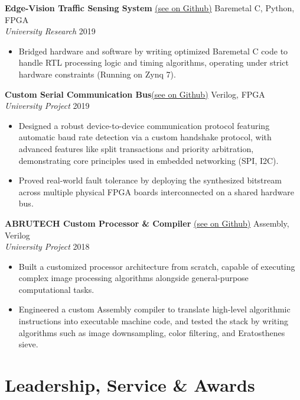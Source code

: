 \documentclass[letterpaper,10pt]{article}
\begin{document}
\vspace{6pt}
\noindent \textbf{Edge-Vision Traffic Sensing System} \href{https://github.com/abrutech/vision-traffic-soc}{(see on Github)} \hfill Baremetal C, Python, FPGA \\
\textit{University Research} \hfill 2019
\begin{itemize}
    \item Bridged hardware and software by writing optimized Baremetal C code to handle RTL processing logic and timing algorithms, operating under strict hardware constraints (Running on Zynq 7).
\end{itemize}

\vspace{6pt}
\noindent \textbf{Custom Serial Communication Bus}\href{https://github.com/abrutech/system-bus}{(see on Github)} \hfill Verilog, FPGA \\
\textit{University Project} \hfill 2019
\begin{itemize}
    \item Designed a robust device-to-device communication protocol featuring automatic baud rate detection via a custom handshake protocol, with advanced features like split transactions and priority arbitration, demonstrating core principles used in embedded networking (SPI, I2C).
    \item Proved real-world fault tolerance by deploying the synthesized bitstream across multiple physical FPGA boards interconnected on a shared hardware bus.
\end{itemize}

\vspace{6pt}
\noindent \textbf{ABRUTECH Custom Processor \& Compiler} \href{https://github.com/BlazeCode2/ABRUTECH_processor_automatic}{(see on Github)} \hfill Assembly, Verilog \\
\textit{University Project} \hfill 2018
\begin{itemize}
    \item Built a customized processor architecture from scratch, capable of executing complex image processing algorithms alongside general-purpose computational tasks.
    \item Engineered a custom Assembly compiler to translate high-level algorithmic instructions into executable machine code, and tested the stack by writing algorithms such as image downsampling, color filtering, and Eratosthenes sieve. 
\end{itemize}

\section{Leadership, Service \& Awards}
\end{document}
